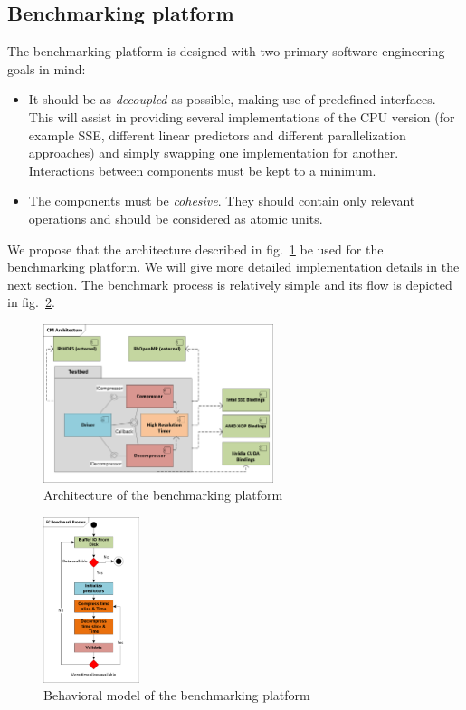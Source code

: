 \subsection{Benchmarking platform}
The benchmarking platform is designed with two primary software engineering goals in mind:
\begin{itemize}
 \item It should be as \textit{decoupled} as possible, making use of predefined interfaces. This will assist in providing several implementations of the CPU version (for example SSE, different linear predictors and different parallelization
 approaches) and simply swapping one implementation for another. Interactions between components must be kept to a minimum.
 \item The components must be \textit{cohesive}. They should contain only relevant operations and should be considered as atomic units.
\end{itemize}
We propose that the architecture described in fig.~\ref{TOOL_ARCH} be used for the benchmarking platform. We will give more detailed implementation details in the next section. The benchmark process is relatively simple
and its flow is depicted in fig.~\ref{TOOL_FLOW}.
\begin{figure}[h!]
 \centering
 \includegraphics[width=0.6\textwidth]{Thesis_Arc.png}
 \caption{Architecture of the benchmarking platform}
 \label{TOOL_ARCH}
\end{figure}
\begin{figure}[h!]
 \centering
 \includegraphics[width=0.25\textwidth]{Thesis_Flow.png}
 \caption{Behavioral model of the benchmarking platform}
 \label{TOOL_FLOW}
\end{figure}
